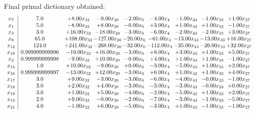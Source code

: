 \documentclass[8pt]{article}
\begin{document}
 Final primal dictionary obtained: 
\[\begin{array}{c| c c@{\hskip 2pt} c@{\hskip 2pt} c@{\hskip 2pt} c@{\hskip 2pt} c@{\hskip 2pt} c@{\hskip 2pt} c@{\hskip 2pt} }
 x_{7}   &  7.0 & +  8.00 x_{32} & -9.00 x_{20} & -2.00 x_{6} & -4.00 x_{4} & -1.00 x_{43} & -1.00 x_{33} & +  1.00 x_{27}\\
 x_{1}   &  5.0 & -8.00 x_{32} & +  8.00 x_{20} & -0.00 x_{6} & +  3.00 x_{4} & +  1.00 x_{43} & +  1.00 x_{33} & -1.00 x_{27}\\
 x_{3}   &  3.0 & + 16.00 x_{32} & -18.00 x_{20} & -3.00 x_{6} & -6.00 x_{4} & -2.00 x_{43} & -2.00 x_{33} & +  3.00 x_{27}\\
 x_{8}   &  65.0 & + 108.00 x_{32} & -127.00 x_{20} & -20.00 x_{6} & -61.00 x_{4} & -13.00 x_{43} & -13.00 x_{33} & + 16.00 x_{27}\\
 x_{12}   &  124.0 & + 241.00 x_{32} & -268.00 x_{20} & -32.00 x_{6} & -112.00 x_{4} & -35.00 x_{43} & -26.00 x_{33} & + 32.00 x_{27}\\
 x_{10}   &  0.999999999996 & -19.00 x_{32} & + 16.00 x_{20} & -3.00 x_{6} & +  8.00 x_{4} & +  3.00 x_{43} & +  1.00 x_{33} & +  5.00 x_{27}\\
 x_{2}   &  0.999999999998 & -9.00 x_{32} & + 10.00 x_{20} & -0.00 x_{6} & +  4.00 x_{4} & +  1.00 x_{43} & +  1.00 x_{33} & -1.00 x_{27}\\
 x_{15}   &  1.0 & + 10.00 x_{32} & -9.00 x_{20} & +  0.00 x_{6} & -3.00 x_{4} & -5.00 x_{43} & +  1.00 x_{33} & +  2.00 x_{27}\\
 x_{16}   &  0.999999999997 & -13.00 x_{32} & + 12.00 x_{20} & -3.00 x_{6} & +  6.00 x_{4} & +  1.00 x_{43} & +  1.00 x_{33} & +  4.00 x_{27}\\
 x_{17}   &  3.0 & +  9.00 x_{32} & -3.00 x_{20} & -3.00 x_{6} & -6.00 x_{4} & -4.00 x_{43} & -0.00 x_{33} & -1.00 x_{27}\\
 x_{18}   &  3.0 & +  2.00 x_{32} & +  4.00 x_{20} & -3.00 x_{6} & -3.00 x_{4} & -3.00 x_{43} & -0.00 x_{33} & +  0.00 x_{27}\\
 x_{19}   &  3.0 & +  1.00 x_{32} & +  5.00 x_{20} & -4.00 x_{6} & -2.00 x_{4} & -5.00 x_{43} & +  1.00 x_{33} & +  2.00 x_{27}\\
 x_{13}   &  2.0 & +  9.00 x_{32} & -0.00 x_{20} & -2.00 x_{6} & -7.00 x_{4} & -3.00 x_{43} & -1.00 x_{33} & -5.00 x_{27}\\
 x_{21}   &  4.0 & -1.00 x_{32} & +  6.00 x_{20} & -5.00 x_{6} & -3.00 x_{4} & +  1.00 x_{43} & -1.00 x_{33} & -1.00 x_{27}\\

\end{array}\]
\end{document}
